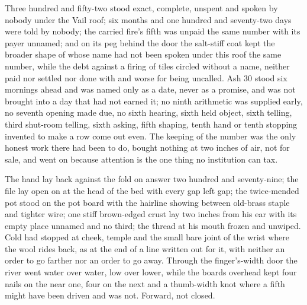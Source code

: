 Three hundred and fifty-two stood exact, complete, unspent and spoken by nobody under the Vail roof; six months and one hundred and seventy-two days were told by nobody; the carried fire's fifth was unpaid the same number with its payer unnamed; and on its peg behind the door the salt-stiff coat kept the broader shape of  whose name had not been spoken under this roof the same number, while the debt against a firing of tiles circled without a name, neither paid nor settled nor done with and worse for being uncalled. Ash 30 stood six mornings ahead and was named only as a date, never as a promise, and was not brought into a day that had not earned it; no ninth arithmetic was supplied early, no seventh opening made due, no sixth hearing, sixth held object, sixth telling, third shut-room telling, sixth asking, fifth shaping, tenth hand or tenth stopping invented to make a row come out even. The keeping of the number was the only honest work there had been to do, bought nothing at two inches of air, not for sale, and went on because attention is the one thing no institution can tax.

The hand lay back against the fold on answer two hundred and seventy-nine; the file lay open on  at the head of the bed with every gap left gap; the twice-mended pot stood on the pot board with the hairline showing between old-brass staple and tighter wire; one stiff brown-edged crust lay two inches from his ear with its empty place unnamed and no third; the thread at his mouth frozen and unwiped. Cold had stopped at cheek, temple and the small bare joint of the wrist where the wool rides back, as at the end of a line written out for it, with neither an order to go farther nor an order to go away. Through the finger's-width door the river went water over water, low over lower, while the boards overhead kept four nails on the near one, four on the next and a thumb-width knot where a fifth might have been driven and was not. Forward, not closed.

